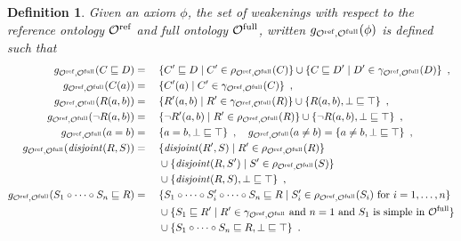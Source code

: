 \documentclass[
]{ceurart}
\newtheorem{definition}{Definition}
\newtheorem{example}{Example}
\begin{document}
\begin{definition}
  Given an axiom $\phi$, the set of \emph{weakenings} with respect to the reference ontology ${\mathcal{O}^\textnormal{ref}}$ and full ontology ${\mathcal{O}^\textnormal{full}}$, written $g_{{\mathcal{O}^\textnormal{ref}},{\mathcal{O}^\textnormal{full}}}(\phi)$ is defined such that
  {\footnotesize
  \begin{alignat*}{2}
    g_{{\mathcal{O}^\textnormal{ref}},{\mathcal{O}^\textnormal{full}}}(C \sqsubseteq D) &={} &&\{ C' \sqsubseteq D \mid C' \in \rho_{{\mathcal{O}^\textnormal{ref}},{\mathcal{O}^\textnormal{full}}} (C) \} \cup \{ C \sqsubseteq D' \mid D' \in \gamma_{{\mathcal{O}^\textnormal{ref}},{\mathcal{O}^\textnormal{full}}}(D) \} \enspace, \\
    g_{{\mathcal{O}^\textnormal{ref}},{\mathcal{O}^\textnormal{full}}}(C(a)) &={} && \{ C'(a) \mid C' \in \gamma_{{\mathcal{O}^\textnormal{ref}},{\mathcal{O}^\textnormal{full}}}(C) \} \enspace, \\
    g_{{\mathcal{O}^\textnormal{ref}},{\mathcal{O}^\textnormal{full}}}(R(a, b)) &={} && \{ R'(a, b) \mid R' \in \gamma_{{\mathcal{O}^\textnormal{ref}},{\mathcal{O}^\textnormal{full}}}(R) \} \cup \{ R(a, b), \bot \sqsubseteq \top \} \enspace, \\
    g_{{\mathcal{O}^\textnormal{ref}},{\mathcal{O}^\textnormal{full}}}(\lnot R(a, b)) &={} && \{ \lnot R'(a, b) \mid R' \in \rho_{{\mathcal{O}^\textnormal{ref}},{\mathcal{O}^\textnormal{full}}}(R) \} \cup \{ \lnot R(a, b), \bot \sqsubseteq \top \} \enspace, \\
    g_{{\mathcal{O}^\textnormal{ref}},{\mathcal{O}^\textnormal{full}}}(a = b) &={} && \{ a = b, \bot \sqsubseteq \top \} \enspace,
    \quad g_{{\mathcal{O}^\textnormal{ref}},{\mathcal{O}^\textnormal{full}}}(a \not= b) = \{ a \not= b, \bot \sqsubseteq \top \} \enspace, \\
    g_{{\mathcal{O}^\textnormal{ref}},{\mathcal{O}^\textnormal{full}}}(\mathit{disjoint}(R, S)) &={} &&\{ \mathit{disjoint}(R', S) \mid R' \in \rho_{{\mathcal{O}^\textnormal{ref}},{\mathcal{O}^\textnormal{full}}} (R) \} \\
    &&& \cup \{ \mathit{disjoint}(R, S') \mid S' \in \rho_{{\mathcal{O}^\textnormal{ref}},{\mathcal{O}^\textnormal{full}}}(S) \} \\
    &&& \cup \{ \mathit{disjoint} (R, S), \bot \sqsubseteq \top \} \enspace, \\
    g_{{\mathcal{O}^\textnormal{ref}},{\mathcal{O}^\textnormal{full}}}(S_1 \circ \cdots \circ S_n \sqsubseteq R) &={} && \{ S_1 \circ \cdots \circ S_i' \circ \cdots \circ S_n \sqsubseteq R \mid S_i' \in \rho_{{\mathcal{O}^\textnormal{ref}},{\mathcal{O}^\textnormal{full}}}(S_i) \text{ for } i = 1, \dots, n \} \\
    &&& \cup \{ S_1 \sqsubseteq R' \mid R' \in \gamma_{{\mathcal{O}^\textnormal{ref}},{\mathcal{O}^\textnormal{full}}} \text{ and } n = 1 \text{ and } S_1 \text{ is simple in } {\mathcal{O}^\textnormal{full}} \} \\
    &&& \cup \{ S_1 \circ \cdots \circ S_n \sqsubseteq R, \bot \sqsubseteq \top \} \enspace.
  \end{alignat*}
  }
\end{definition}

\end{document}

